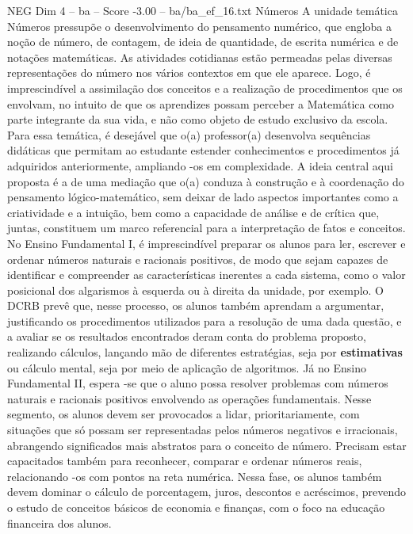 \begin{textsample}{NEG Dim 4 – ba – Score -3.00 – ba/ba\_ef\_16.txt}  \label{ex:f4_neg_261}
Números A unidade temática Números pressupõe o desenvolvimento do pensamento numérico, que engloba a noção de número, de contagem, de ideia de quantidade, de escrita numérica e de notações matemáticas.
As atividades cotidianas estão permeadas pelas diversas representações do número nos vários contextos em que ele aparece.
Logo, é imprescindível a assimilação dos conceitos e a realização de procedimentos que os envolvam, no intuito de que os aprendizes possam perceber a Matemática como parte integrante da sua vida, e não como objeto de estudo exclusivo da escola.
Para essa temática, é desejável que o(a) professor(a) desenvolva sequências didáticas que permitam ao estudante estender conhecimentos e procedimentos já adquiridos anteriormente, ampliando -os em complexidade.
A ideia central aqui proposta é a de uma mediação que o(a) conduza à construção e à coordenação do pensamento lógico-matemático, sem deixar de lado aspectos importantes como a criatividade e a intuição, bem como a capacidade de análise e de crítica que, juntas, constituem um marco referencial para a interpretação de fatos e conceitos.
No Ensino Fundamental I, é imprescindível preparar os alunos para ler, escrever e ordenar números naturais e racionais positivos, de modo que sejam capazes de identificar e compreender as características inerentes a cada sistema, como o valor posicional dos algarismos à esquerda ou à direita da unidade, por exemplo.
O DCRB prevê que, nesse processo, os alunos também aprendam a argumentar, justificando os procedimentos utilizados para a resolução de uma dada questão, e a avaliar se os resultados encontrados deram conta do problema proposto, realizando cálculos, lançando mão de diferentes estratégias, seja por \textbf{estimativas} ou cálculo mental, seja por meio de aplicação de algoritmos.
Já no Ensino Fundamental II, espera -se que o aluno possa resolver problemas com números naturais e racionais positivos envolvendo as operações fundamentais.
Nesse segmento, os alunos devem ser provocados a lidar, prioritariamente, com situações que só possam ser representadas pelos números negativos e irracionais, abrangendo significados mais abstratos para o conceito de número.
Precisam estar capacitados também para reconhecer, comparar e ordenar números reais, relacionando -os com pontos na reta numérica.
Nessa fase, os alunos também devem dominar o cálculo de porcentagem, juros, descontos e acréscimos, prevendo o estudo de conceitos básicos de economia e finanças, com o foco na educação financeira dos alunos.

\end{textsample}
